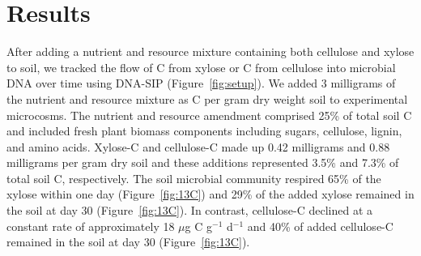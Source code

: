 \section{Results}
After adding a nutrient and resource mixture containing
both cellulose and xylose to soil, we tracked the flow of C from xylose or
C from cellulose into microbial DNA over time using DNA-SIP
(Figure~\ref{fig:setup}). We added 3 milligrams of the nutrient and resource
mixture as C per gram dry weight soil to experimental microcosms. The nutrient
and resource amendment comprised 25\% of total soil C and included fresh plant
biomass components including sugars, cellulose, lignin, and amino acids.
Xylose-C and cellulose-C made up 0.42 milligrams and 0.88 milligrams per gram
dry soil and these additions represented 3.5\% and 7.3\% of total soil C,
respectively. The soil microbial community respired 65\% of the xylose within
one day (Figure~\ref{fig:13C}) and 29\% of the added xylose remained in the
soil at day 30 (Figure~\ref{fig:13C}). In contrast, cellulose-C declined at
a constant rate of approximately 18 $\mu$g C g$^{-1}$ d$^{-1}$ and 40\% of
added cellulose-C remained in the soil at day 30 (Figure~\ref{fig:13C}). 


